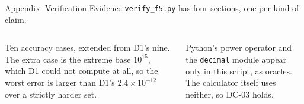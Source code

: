 \documentclass[11pt]{beamer}
\begin{document}
\begin{frame}{Appendix: Verification Evidence}
  \scriptsize
  \texttt{verify\_f5.py} has four sections, one per kind of claim.
  \begin{columns}[T]
      \medskip

      Ten accuracy cases, extended from D1's nine. The extra case is the
      extreme base $10^{15}$, which D1 could not compute at all, so the
      worst error is larger than D1's $2.4\times10^{-12}$ over a strictly
      harder set.
      \medskip

      Python's power operator and the \texttt{decimal} module appear only
      in this script, as oracles. The calculator itself uses neither, so
      DC-03 holds.
  \end{columns}
\end{frame}
\end{document}
